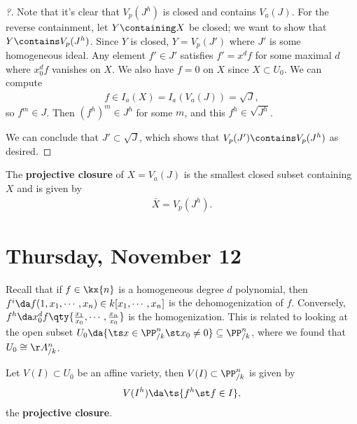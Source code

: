 \begin{proof}[?]

Note that it's clear that \(V_p(J^h)\) is closed and contains
\(V_a(J)\). For the reverse containment, let \(Y\containing X\) be
closed; we want to show that \(Y\contains V_p(J^h)\). Since \(Y\) is
closed, \(Y = V_p(J')\) where \(J'\) is some homogeneous ideal. Any
element \(f'\in J'\) satisfies \(f' = x^d f\) for some maximal \(d\)
where \(x_0^d f\) vanishes on \(X\). We also have \(f=0\) on \(X\) since
\(X\subset U_0\). We can compute
\begin{align*}  
f\in I_a(X) = I_a(V_a(J)) = \sqrt J
,\end{align*} so \(f^m\in J\). Then \((f^h)^m \in J^h\) for some \(m\),
and this \(f^h \in \sqrt{J^h}\).

We can conclude that \(J'\subset \sqrt J\), which shows that
\(V_p(J') \contains V_p(J^h)\) as desired.

\end{proof}

\begin{definition}

The \textbf{projective closure} of \(X = V_a(J)\) is the smallest closed
subset containing \(X\) and is given by
\begin{align*}  
\bar{X} = V_p(J^h)
.\end{align*}

\end{definition}

\hypertarget{thursday-november-12}{%
\section{Thursday, November 12}\label{thursday-november-12}}

Recall that if \(f\in \kx{n}\) is a homogeneous degree \(d\) polynomial,
then \(f^i \da f(1, x_1, \cdots, x_n) \in k[x_1,\cdots, x_n]\) is the
dehomogenization of \(f\). Conversely,
\(f^h \da x_0^d f\qty{ {x_1 \over x_0}, \cdots, {x_n \over x_0} }\) is
the homogenization. This is related to looking at the open subset
\(U_0 \da {\ts x\in \PP^n_{/k} \st x_0\neq 0} \subseteq \PP^n_{/k}\),
where we found that \(U_0 \cong \AA^n_{/k}\).

\begin{proposition}

Let \(V(I) \subset U_0\) be an affine variety, then
\(V(I) \subset \PP^n_{/k}\) is given by
\begin{align*}
V(I^h) \da \ts{f^h \st f\in I}
,\end{align*} the \textbf{projective closure}.

\end{proposition}

